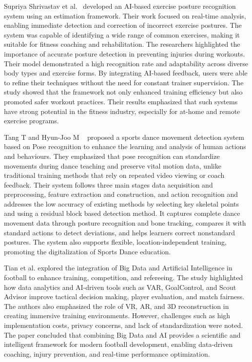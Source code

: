 Supriya Shrivastav et al.~\cite{shrivastav2025exercise} developed an AI-based exercise posture recognition system using an estimation framework. Their work focused on real-time analysis, enabling immediate 
detection and correction of incorrect exercise postures. The system was capable of identifying 
a wide range of common exercises, making it suitable for fitness coaching and rehabilitation. 
The researchers highlighted the importance of accurate posture detection in preventing injuries 
during workouts. Their model demonstrated a high recognition rate and adaptability across 
diverse body types and exercise forms. By integrating AI-based feedback, users were able to 
refine their techniques without the need for constant trainer supervision. The study showed that 
the framework not only enhanced training efficiency but also promoted safer workout practices. 
Their results emphasized that such systems have strong potential in the fitness industry, 
especially for at-home and remote exercise programs.

Tang T and Hyun-Joo M ~\cite{tang2022sportsdance} proposed a sports dance movement detection system based on 
Pose recognition to enhance the learning and analysis of human actions and behaviours. They 
emphasized that pose recognition can standardize movements during dance teaching and 
preserve vital motion data, unlike traditional training methods that rely on repeated video 
viewing or coach feedback. Their system follows three main stages data acquisition and 
preprocessing, feature extraction and construction, and action recognition and addresses the 
low accuracy of existing methods by selecting key skeletal points and using a residual block
based detection method. It captures complete dance movement data through posture 
recognition and bone tracking, compares it with standard actions to detect deviations, and helps 
learners correct nonstandard postures. The system also supports flexible, location-independent 
training, promoting the digitalization of Sports Dance education. 

Tian et al. \cite{tian2024bigdata} explored the integration of Big Data and Artificial Intelligence in football to enhance training, competition, and refereeing. The study highlighted how data analytics and 
AI-driven tools such as VAR, GoalControl, and Scout Advisor improve tactical decision
making, player evaluation, and match fairness. The authors also emphasized the role of VR, 
AR, and 3D reconstruction in creating immersive training environments. However, challenges 
such as high implementation costs, privacy concerns, and lack of standardization were noted. 
The paper concluded that combining Big Data and AI provides a scientific and intelligent 
framework for modern football development, enabling data-driven coaching, injury prevention, 
and real-time performance optimization.

